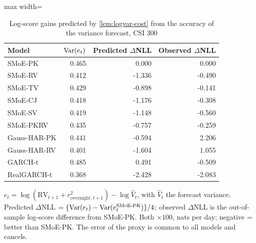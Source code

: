 \begin{table}[!htbp]\centering\small
\caption{Log-score gains predicted by \cref{lem:logvar-cost} from the accuracy of the variance forecast, CSI 300}\label{tab:rv-lemma}
\begin{adjustbox}{max width=\textwidth}
\begin{tabular}{lrrr}
\toprule
Model & $\operatorname{Var}(e_t)$ & Predicted $\Delta$NLL & Observed $\Delta$NLL\\
\midrule
SMoE-PK & 0.465 & 0.000 & 0.000\\
SMoE-RV & 0.412 & -1.336 & -0.490\\
SMoE-TV & 0.429 & -0.898 & -0.141\\
SMoE-CJ & 0.418 & -1.176 & -0.308\\
SMoE-SV & 0.419 & -1.148 & -0.560\\
SMoE-PKRV & 0.435 & -0.757 & -0.259\\
Gauss-HAR-PK & 0.441 & -0.594 & 2.206\\
Gauss-HAR-RV & 0.401 & -1.604 & 1.055\\
GARCH-t & 0.485 & 0.491 & -0.509\\
RealGARCH-t & 0.368 & -2.428 & -2.083\\
\bottomrule
\end{tabular}
\end{adjustbox}
\par\smallskip\begin{minipage}{\textwidth}\footnotesize
$e_t=\log(\mathrm{RV}_{t+1}+r^2_{\text{overnight},t+1})-\log\hat V_t$, with $\hat V_t$ the forecast variance. Predicted $\Delta$NLL $=\{\operatorname{Var}(e_t)-\operatorname{Var}(e_t^{\text{SMoE-PK}})\}/4$; observed $\Delta$NLL is the out-of-sample log-score difference from SMoE-PK. Both $\times100$, nats per day; negative = better than SMoE-PK. The error of the proxy is common to all models and cancels.
\end{minipage}
\end{table}
